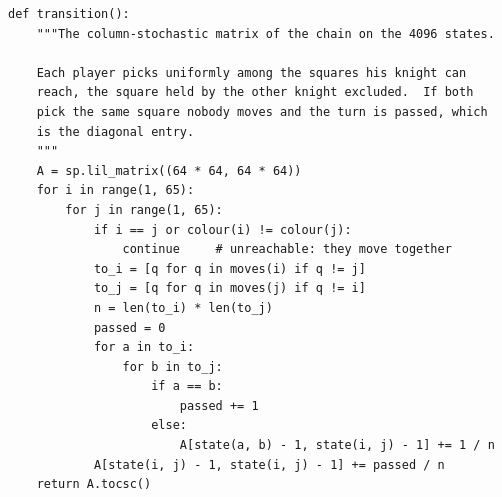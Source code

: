 \begin{verbatim}
def transition():
    """The column-stochastic matrix of the chain on the 4096 states.

    Each player picks uniformly among the squares his knight can
    reach, the square held by the other knight excluded.  If both
    pick the same square nobody moves and the turn is passed, which
    is the diagonal entry.
    """
    A = sp.lil_matrix((64 * 64, 64 * 64))
    for i in range(1, 65):
        for j in range(1, 65):
            if i == j or colour(i) != colour(j):
                continue     # unreachable: they move together
            to_i = [q for q in moves(i) if q != j]
            to_j = [q for q in moves(j) if q != i]
            n = len(to_i) * len(to_j)
            passed = 0
            for a in to_i:
                for b in to_j:
                    if a == b:
                        passed += 1
                    else:
                        A[state(a, b) - 1, state(i, j) - 1] += 1 / n
            A[state(i, j) - 1, state(i, j) - 1] += passed / n
    return A.tocsc()
\end{verbatim}
